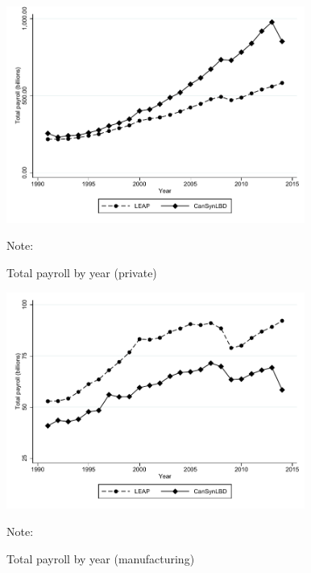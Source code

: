 

\begin{figure} [H]
\centering
\caption{Total payroll by year (private)} \label{tab:Can:TotalPayrollPrivate}
\includegraphics[height=2.8in, width=.7\linewidth]{graphs/Total_payroll_by_year_private_bw.pdf} 
\begin{minipage}{0.85\textwidth}
{\footnotesize Note: \CanTableNote \par}
\end{minipage}
\end{figure}
\begin{figure} [H]
\centering
\caption{Total payroll by year (manufacturing)} \label{tab:Can:TotalPayrollManufacturing}
\includegraphics[height=2.8in, width=.7\linewidth]{graphs/Total_payroll_by_year_manufacturing_bw.pdf} 
\begin{minipage}{0.85\textwidth}
{\footnotesize Note: \CanTableNote \par}
\end{minipage}
\end{figure}


